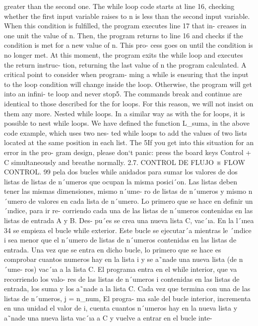 \begin{paracol}{2}
{greater than the second one. The while loop
code starts at line 16, checking whether the
first input variable raises to n is less than the
second input variable. When this condition is
fulfilled, the program executes line 17 that in-
creases in one unit the value of n. Then, the
program returns to line 16 and checks if the
condition is met for a new value of n. This pro-
cess goes on until the condition is no longer
met. At this moment, the program exits the
while loop and executes the return instruc-
tion, returning the last value of n the program
calculated.
A critical point to consider when program-
ming a while is ensuring that the input to
the loop condition will change inside the loop.
Otherwise, the program will get into an infini-
te loop and never stop5. The commands break
and continue are identical to those described
for the for loops. For this reason, we will not
insist on them any more.
Nested while loops. In a similar way as
with the for loops, it is possible to nest while
loops. We have defined the function L_suma, in
the above code example, which uses two nes-
ted while loops to add the values of two lists
located at the same position in each list. The
5If you get into this situation for an error in the pro-
gram design, please don‘t panic: press the board keys
Control + C simultaneously and breathe normally.
2.7. CONTROL DE FLUJO ※ FLOW CONTROL. 99
pela dos bucles while anidados para sumar los
valores de dos listas de listas de n´umeros que
ocupan la misma posici´on. Las listas deben
tener las mismas dimensiones, mismo n´ume-
ro de listas de n´umeros y mismo n´umero de
valores en cada lista de n´umero. Lo primero
que se hace en definir un ´ındice, para ir re-
corriendo cada una de las listas de n´umeros
contenidas en las listas de entrada A y B. Des-
pu´es se crea una nueva lista C, vac´ıa. En la
l´ınea 34 se empieza el bucle while exterior.
Este bucle se ejecutar´a mientras le ´ındice i
sea menor que el n´umero de listas de n´umeros
contenidas en las listas de entrada. Una vez
que se entra en dicho bucle, lo primero que se
hace es comprobar cuantos numeros hay en la
lista i y se a˜nade una nueva lista (de n´ume-
ros) vac´ıa a la lista C. El programa entra en
el while interior, que va recorriendo los valo-
res de las listas de n´umeros i contenidas en
las listas de entrada, los suma y los a˜nade a
la lista C. Cada vez que termina con una de
las listas de n´umeros, j = n_num, El progra-
ma sale del bucle interior, incrementa en una
unidad el valor de i, cuenta cuantos n´umeros
hay en la nueva lista y a˜nade una nueva lista
vac´ıa a C y vuelve a entrar en el bucle inte-
}
\end{paracol}

